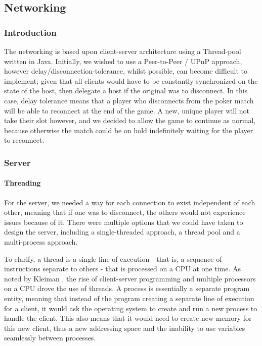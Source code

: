\documentclass[11pt]{article}
\begin{document}
\newpage

\subsection{Networking}
\subsubsection{Introduction}
The networking is based upon client-server architecture using a Thread-pool written in Java. Initially, we wished to use a Peer-to-Peer / UPnP approach, however delay/disconnection-tolerance, whilst possible, can become difficult to implement; given that all clients would have to be constantly synchronized on the state of the host, then delegate a host if the original was to disconnect. %
In this case, delay tolerance means that a player who disconnects from the poker match will be able to reconnect at the end of the game. A new, unique player will not take their slot however, and we decided to allow the game to continue as normal, because otherwise the match could be on hold indefinitely waiting for the player to reconnect.

\subsubsection{Server}

\paragraph*{Threading} 

For the server, we needed a way for each connection to exist independent of each other, meaning that if one was to disconnect, the others would not experience issues because of it. There were multiple options that we could have taken to design the server, including a single-threaded approach, a thread pool and a multi-process approach. 

To clarify, a thread is a single line of execution - that is, a sequence of instructions separate to others - that is processed on a CPU at one time. As noted by Kleiman \cite{client_server}, the rise of client-server programming and multiple processors on a CPU drove the use of threads. A process is essentially a separate program entity, meaning that instead of the program creating a separate line of execution for a client, it would ask the operating system to create and run a new process to handle the client. This also means that it would need to create new memory for this new client, thus a new addressing space and the inability to use variables seamlessly between processes. 
\end{document}
